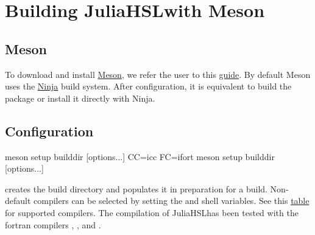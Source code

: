 \documentclass[gdweb]{geradwp}
\newcommand{\JuliaHSL}{JuliaHSL}  %
\begin{document}
\section{Building \JuliaHSL with Meson}

\subsection{Meson}

To download and install \href{https://mesonbuild.com}{Meson}, we refer the user to this \href{https://mesonbuild.com/SimpleStart.html}{guide}.
By default Meson uses the \href{https://ninja-build.org/}{Ninja} build system.
After configuration, it is equivalent to build the package or install it directly with Ninja.

\subsection{Configuration}

\begin{jllisting}
meson setup builddir [options...]
CC=icc FC=ifort meson setup builddir [options...]
\end{jllisting}
creates the build directory  and populates it in preparation for a build.
Non-default compilers can be selected by setting the  and  shell variables.
See this \href{https://mesonbuild.com/Reference-tables.html}{table} for supported compilers.
The compilation of \JuliaHSL has been tested with the fortran compilers , ,  and .
\end{document}
